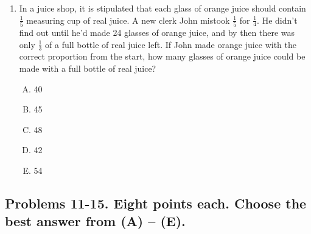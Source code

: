 \documentclass[12pt]{scrartcl}
\begin{document}
\begin{enumerate}
    \item In a juice shop, it is stipulated that each glass of orange juice should contain $\frac{1}{5}$ measuring cup of real juice. A new clerk John mistook $\frac{1}{5}$ for $\frac{1}{4}$. He didn't find out until he'd made 24 glasses of orange juice, and by then there was only $\frac{1}{3}$ of a full bottle of real juice left. If John made orange juice with the correct proportion from the start, how many glasses of orange juice could be made with a full bottle of real juice?
    \begin{multicols}{5}
        \begin{enumerate}[(A)]
            \item 40
            \item 45
            \item 48
            \item 42
            \item 54
        \end{enumerate}
    \end{multicols}
\end{enumerate}

\subsection*{Problems 11-15. Eight points each. Choose the best answer from (A) -- (E).}
\end{document}
